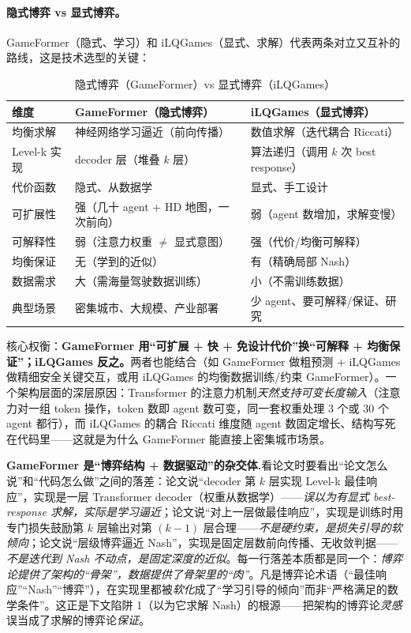 \paragraph{隐式博弈 vs 显式博弈。}
GameFormer（隐式、学习）和 iLQGames（显式、求解）代表两条对立又互补的路线，这是技术选型的关键：

\begin{table}[H]\centering\small
\caption{隐式博弈（GameFormer）vs 显式博弈（iLQGames）}
\label{tab:rtg-implicit-explicit}
\begin{tabular}{p{} p{} p{}}
\toprule
维度 & GameFormer（隐式博弈） & iLQGames（显式博弈） \\
\midrule
均衡求解 & 神经网络学习逼近（前向传播） & 数值求解（迭代耦合 Riccati） \\
Level-k 实现 & decoder 层（堆叠 $k$ 层） & 算法递归（调用 $k$ 次 best response） \\
代价函数 & 隐式、从数据学 & 显式、手工设计 \\
可扩展性 & 强（几十 agent + HD 地图，一次前向） & 弱（agent 数增加，求解变慢） \\
可解释性 & 弱（注意力权重 $\ne$ 显式意图） & 强（代价/均衡可解释） \\
均衡保证 & 无（学到的近似） & 有（精确局部 Nash） \\
数据需求 & 大（需海量驾驶数据训练） & 小（不需训练数据） \\
典型场景 & 密集城市、大规模、产业部署 & 少 agent、要可解释/保证、研究 \\
\bottomrule
\end{tabular}
\end{table}

\noindent 核心权衡：\textbf{GameFormer 用“可扩展 + 快 + 免设计代价”换“可解释 + 均衡保证”；iLQGames 反之。}两者也能结合（如 GameFormer 做粗预测 + iLQGames 做精细安全关键交互，或用 iLQGames 的均衡数据训练/约束 GameFormer）。一个架构层面的深层原因：Transformer 的注意力机制\emph{天然支持可变长度输入}（注意力对一组 token 操作，token 数即 agent 数可变，同一套权重处理 $3$ 个或 $30$ 个 agent 都行），而 iLQGames 的耦合 Riccati 维度随 agent 数固定增长、结构写死在代码里——这就是为什么 GameFormer 能直接上密集城市场景。

\begin{insight}
\textbf{GameFormer 是“博弈结构 + 数据驱动”的杂交体.}\;看论文时要看出“论文怎么说”和“代码怎么做”之间的落差：论文说“decoder 第 $k$ 层实现 Level-k 最佳响应”，实现是一层 Transformer decoder（权重从数据学）——\emph{误以为有显式 best-response 求解，实际是学习逼近}；论文说“对上一层做最佳响应”，实现是训练时用专门损失鼓励第 $k$ 层输出对第 $(k-1)$ 层合理——\emph{不是硬约束，是损失引导的软倾向}；论文说“层级博弈逼近 Nash”，实现是固定层数前向传播、无收敛判据——\emph{不是迭代到 Nash 不动点，是固定深度的近似}。每一行落差本质都是同一个：\emph{博弈论提供了架构的“骨架”，数据提供了骨架里的“肉”}。凡是博弈论术语（“最佳响应”“Nash”“博弈”），在实现里都被\emph{软化}成了“学习引导的倾向”而非“严格满足的数学条件”。这正是下文陷阱 1（以为它求解 Nash）的根源——把架构的博弈论\emph{灵感}误当成了求解的博弈论\emph{保证}。
\end{insight}

